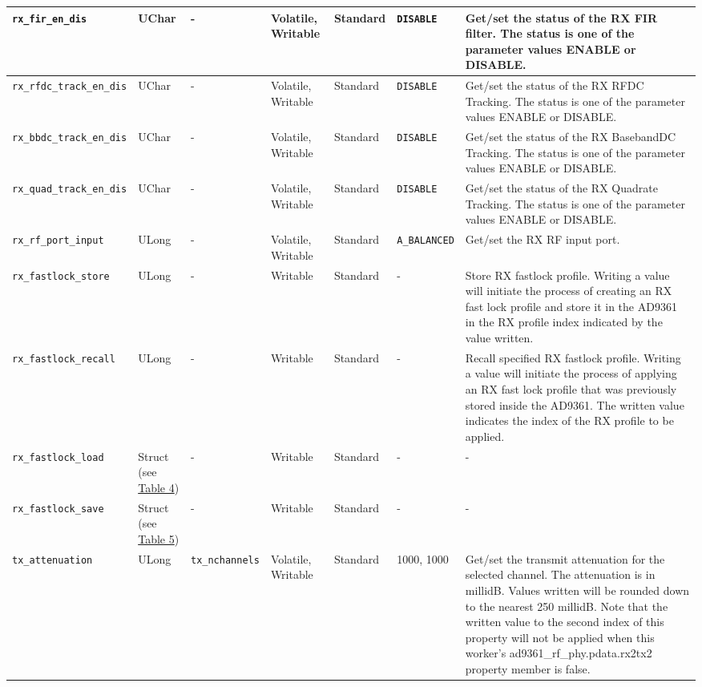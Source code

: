 \documentclass{article}
\begin{document}
\begin{landscape}
\begin{scriptsize}
\begin{longtable}{|p{3.6cm}|p{8.1cm}|p{1.4cm}|p{1.3cm}|p{1.4cm}|p{2.5cm}|p{3.6cm}|}
			\hline
			\verb+rx_fir_en_dis+ & UChar & - & Volatile, Writable & Standard & \verb+DISABLE+ & Get/set the status of the RX FIR filter. The status is one of the parameter values ENABLE or DISABLE. \\
			\hline
			\verb+rx_rfdc_track_en_dis+ & UChar & - & Volatile, Writable & Standard & \verb+DISABLE+ & Get/set the status of the RX RFDC Tracking. The status is one of the parameter values ENABLE or DISABLE.\\
			\hline
			\verb+rx_bbdc_track_en_dis+ & UChar & - & Volatile, Writable & Standard & \verb+DISABLE+ & Get/set the status of the RX BasebandDC Tracking. The status is one of the parameter values ENABLE or DISABLE.\\
			\hline
			\verb+rx_quad_track_en_dis+ & UChar & - & Volatile, Writable & Standard & \verb+DISABLE+ & Get/set the status of the RX Quadrate Tracking. The status is one of the parameter values ENABLE or DISABLE. \\
			\hline
			\verb+rx_rf_port_input+ & ULong & - & Volatile, Writable & Standard & \verb+A_BALANCED+ & Get/set the RX RF input port. \\
			\hline
			\verb+rx_fastlock_store+ & ULong & - & Writable & Standard & - & Store RX fastlock profile. Writing a value will initiate the process of creating an RX fast lock profile and store it in the AD9361 in the RX profile index indicated by the value written. \\
			\hline
			\verb+rx_fastlock_recall+ & ULong & - & Writable & Standard & - & Recall specified RX fastlock profile. Writing a value will initiate the process of applying an RX fast lock profile that was previously stored inside the AD9361. The written value indicates the index of the RX profile to be applied. \\
			\hline
			\verb+rx_fastlock_load+ & Struct (see \hyperlink{tab4}{Table 4}) & - & Writable & Standard & - & - \\
			\hline
			\verb+rx_fastlock_save+ & Struct (see \hyperlink{tab5}{Table 5}) & - & Writable & Standard & - & - \\
			\hline
			\verb+tx_attenuation+ & ULong & \verb+tx_nchannels+ & Volatile, Writable & Standard & 1000, 1000 & Get/set the transmit attenuation for the selected channel. The attenuation is in millidB. Values written will be rounded down to the nearest 250 millidB. Note that the written value to the second index of this property will not be applied when this worker's ad9361\_rf\_phy.pdata.rx2tx2 property member is false. \\

\end{longtable}
\end{scriptsize}
\end{landscape}
\end{document}
